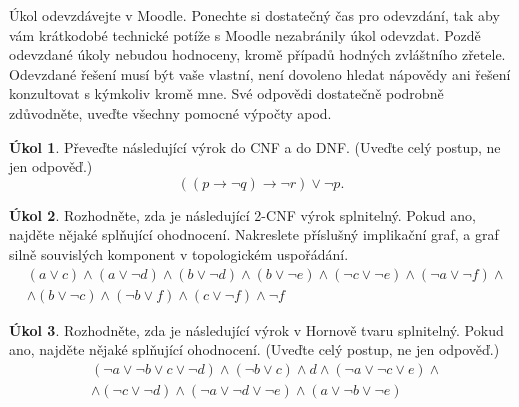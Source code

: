 \documentclass[a4paper]{amsart}
\theoremstyle{definition}
\newtheorem{task}{Úkol}
\begin{document}
\maketitle

\thispagestyle{empty}

Úkol odevzdávejte v Moodle. Ponechte si dostatečný čas pro odevzdání, tak aby vám krátkodobé technické potíže s Moodle nezabránily úkol odevzdat. Pozdě odevzdané úkoly nebudou hodnoceny, kromě případů hodných zvláštního zřetele. Odevzdané řešení musí být vaše vlastní, není dovoleno hledat nápovědy ani řešení konzultovat s kýmkoliv kromě mne. Své odpovědi dostatečně podrobně zdůvodněte, uveďte všechny pomocné výpočty apod.


\begin{task}
Převeďte následující výrok do CNF a do DNF. (Uveďte celý postup, ne jen odpověď.)
$$
((p\to \neg q) \to \neg r) \vee \neg p.
$$
\end{task}

\begin{task}
Rozhodněte, zda je následující 2-CNF výrok splnitelný. Pokud ano, najděte nějaké splňující ohodnocení. Nakreslete příslušný implikační graf, a graf silně souvislých komponent v topologickém uspořádání.
\begin{align*}
&(a \vee  c) \wedge  (a \vee  \neg d) \wedge  (b \vee  \neg d) 
\wedge  (b \vee  \neg e) \wedge  (\neg c \vee  \neg e) 
\wedge  (\neg a \vee  \neg f)
\wedge \\ &\wedge (b\vee\neg c)\wedge
(\neg b \vee  f) \wedge  (c \vee  \neg f) \wedge \neg f
\end{align*}
\end{task}

\begin{task}
Rozhodněte, zda je následující výrok v Hornově tvaru splnitelný. Pokud ano, najděte nějaké splňující ohodnocení. (Uveďte celý postup, ne jen odpověď.)
\begin{align*}
&(\neg a \vee \neg b \vee c \vee \neg d)\wedge(\neg b \vee c)\wedge d \wedge (\neg a \vee \neg c \vee e)\wedge \\
&\wedge(\neg c \vee \neg d)\wedge(\neg a \vee \neg d \vee \neg e)\wedge(a\vee \neg b \vee\neg e)
\end{align*}
\end{task}
\end{document}
